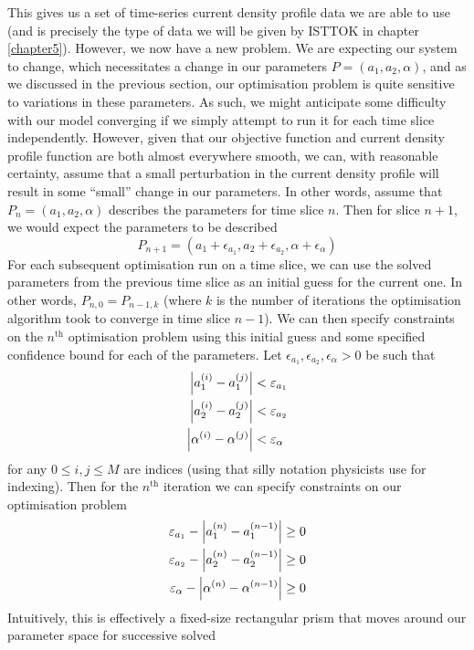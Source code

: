 This gives us a set of time-series current density profile data we are able to use (and is precisely 
the type of data we will be given by ISTTOK in chapter \ref{chapter5}). However, we now have a new problem. 
We are expecting our system to change, which necessitates a change in our parameters $P = (a_1, a_2, \alpha)$, and as we 
discussed in the previous section, our optimisation problem is quite sensitive to variations in these parameters. 
As such, we might anticipate some difficulty with our model converging if we simply attempt to run it for each 
time slice independently. However, given that our objective function and current density profile function are both almost everywhere smooth, we can, with 
reasonable certainty, assume that a small perturbation in the current density profile will result in some ``small'' 
change in our parameters. In other words, assume that $P_n = (a_1, a_2, \alpha)$ describes the parameters for 
time slice $n$. Then for slice $n + 1$, we would expect the parameters to be described
$$P_{n+1} = (a_1 + \epsilon_{a_1}, a_2 + \epsilon_{a_2}, \alpha + \epsilon_{\alpha})$$
For each subsequent optimisation run on a time slice, we can use the solved parameters from the previous time slice as an 
initial guess for the current one. In other words, $P_{n,0} = P_{n-1, k}$ (where $k$ is the number of iterations the 
optimisation algorithm took to converge in time slice $n-1$). We can then specify constraints on the $n^{\text{th}}$ 
optimisation problem using this initial guess and some specified confidence bound for each of the parameters. 
Let $\epsilon_{a_1},\epsilon_{a_2}, \epsilon_{\alpha} > 0$ be such that
\begin{align*}
    \abs{a_1^{(i)} - a_1^{(j)}} & < \varepsilon_{a_1} \\
    \abs{a_2^{(i)} - a_2^{(j)}} & < \varepsilon_{a_2} \\
    \abs{\alpha^{(i)} - \alpha^{(j)}} & < \varepsilon_{\alpha}
\end{align*}
for any $0 \le i,j \le M$ are indices (using that silly notation physicists use for indexing). Then for the $n^{\text{th}}$ iteration we can specify constraints on our optimisation problem
\begin{align*}
    \varepsilon_{a_1} - \abs{a_{1}^{(n)} - a_{1}^{(n-1)}} & \ge 0  \\
    \varepsilon_{a_2} - \abs{a_{2}^{(n)} - a_{2}^{(n-1)}} & \ge 0 \\ 
    \varepsilon_{\alpha} - \abs{\alpha^{(n)} - \alpha^{(n-1)}} & \ge 0
\end{align*}
Intuitively, this is effectively a fixed-size rectangular prism that moves around our parameter space for successive solved 
